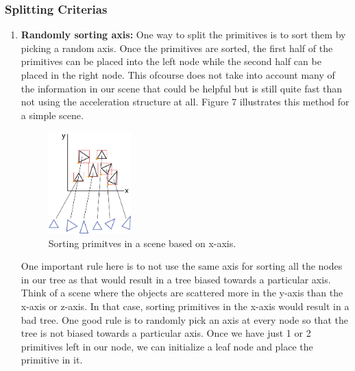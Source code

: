 \documentclass[11pt,a4paper]{article}
\begin{document}
\subsubsection{Splitting Criterias}
\begin{enumerate}
\item \textbf{Randomly sorting axis:}
One way to split the primitives is to sort them by picking a random axis. Once the primitives are sorted, the first half of the primitives can be placed into the left node while the second half can be placed in the right node. This ofcourse does not take into account many of the information in our scene that could be helpful but is still quite fast than not using the acceleration structure at all. Figure 7 illustrates this method for a simple scene.
\begin{figure}[H]
	\centering
	\captionsetup{justification=centering,margin=2cm}
	\includegraphics[width=0.3\textwidth]{sorting_bvh}
	\caption{Sorting primitves in a scene based on x-axis.}
\end{figure}
One important rule here is to not use the same axis for sorting all the nodes in our tree as that would result in a tree biased towards a particular axis. Think of a scene where the objects are scattered more in the y-axis than the x-axis or z-axis. In that case, sorting primitives in the x-axis would result in a bad tree. One good rule is to randomly pick an axis at every node so that the tree is not biased towards a particular axis. Once we have just 1 or 2 primitives left in our node, we can initialize a leaf node and place the primitive in it.


\end{enumerate}
\end{document}
